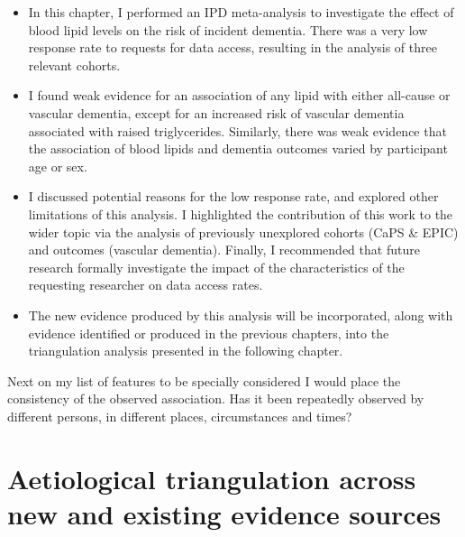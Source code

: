 \documentclass[a4paper, twoside]{templates/ociamthesis}
\begin{document}
\begin{itemize}
\item
  In this chapter, I performed an IPD meta-analysis to investigate the effect of blood lipid levels on the risk of incident dementia. There was a very low response rate to requests for data access, resulting in the analysis of three relevant cohorts.
\item
  I found weak evidence for an association of any lipid with either all-cause or vascular dementia, except for an increased risk of vascular dementia associated with raised triglycerides. Similarly, there was weak evidence that the association of blood lipids and dementia outcomes varied by participant age or sex.
\item
  I discussed potential reasons for the low response rate, and explored other limitations of this analysis. I highlighted the contribution of this work to the wider topic via the analysis of previously unexplored cohorts (CaPS \& EPIC) and outcomes (vascular dementia). Finally, I recommended that future research formally investigate the impact of the characteristics of the requesting researcher on data access rates.
\item
  The new evidence produced by this analysis will be incorporated, along with evidence identified or produced in the previous chapters, into the triangulation analysis presented in the following chapter.
\end{itemize}

\begin{savequote}
Next on my list of features to be specially considered I would place the
consistency of the observed association. Has it been repeatedly observed
by different persons, in different places, circumstances and times?
\end{savequote}



\hypertarget{tri-heading}{%
\chapter{Aetiological triangulation across new and existing evidence sources}\label{tri-heading}}

~

\minitoc 

\newpage
\end{document}

